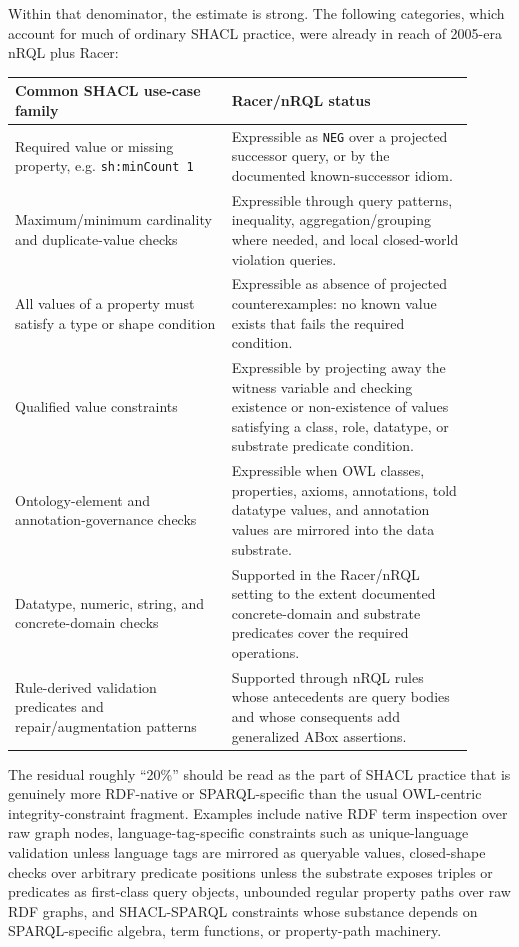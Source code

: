 \documentclass[11pt,letterpaper]{article}
\newcommand{\nrql}{nRQL}
\begin{document}
Within that denominator, the estimate is strong. The following categories, which account for much of ordinary SHACL practice, were already in reach of 2005-era \nrql{} plus Racer:

\begin{longtable}{p{0.43\linewidth}p{0.48\linewidth}}
\toprule
\textbf{Common SHACL use-case family} & \textbf{Racer/nRQL status} \\
\midrule
Required value or missing property, e.g. \texttt{sh:minCount 1} & Expressible as \texttt{NEG} over a projected successor query, or by the documented known-successor idiom. \\
\addlinespace
Maximum/minimum cardinality and duplicate-value checks & Expressible through query patterns, inequality, aggregation/grouping where needed, and local closed-world violation queries. \\
\addlinespace
All values of a property must satisfy a type or shape condition & Expressible as absence of projected counterexamples: no known value exists that fails the required condition. \\
\addlinespace
Qualified value constraints & Expressible by projecting away the witness variable and checking existence or non-existence of values satisfying a class, role, datatype, or substrate predicate condition. \\
\addlinespace
Ontology-element and annotation-governance checks & Expressible when OWL classes, properties, axioms, annotations, told datatype values, and annotation values are mirrored into the data substrate. \\
\addlinespace
Datatype, numeric, string, and concrete-domain checks & Supported in the Racer/nRQL setting to the extent documented concrete-domain and substrate predicates cover the required operations. \\
\addlinespace
Rule-derived validation predicates and repair/augmentation patterns & Supported through nRQL rules whose antecedents are query bodies and whose consequents add generalized ABox assertions. \\
\bottomrule
\end{longtable}

The residual roughly ``20\%'' should be read as the part of SHACL practice that is genuinely more RDF-native or SPARQL-specific than the usual OWL-centric integrity-constraint fragment. Examples include native RDF term inspection over raw graph nodes, language-tag-specific constraints such as unique-language validation unless language tags are mirrored as queryable values, closed-shape checks over arbitrary predicate positions unless the substrate exposes triples or predicates as first-class query objects, unbounded regular property paths over raw RDF graphs, and SHACL-SPARQL constraints whose substance depends on SPARQL-specific algebra, term functions, or property-path machinery.
\end{document}

